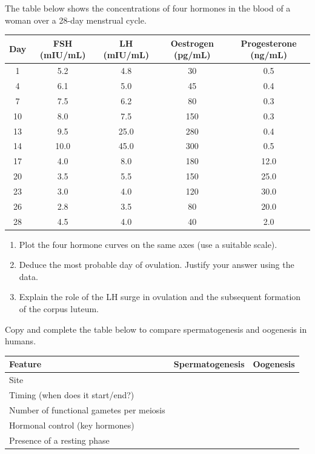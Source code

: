 \documentclass[11pt]{article}
\begin{document}
\begin{exercice}
The table below shows the concentrations of four hormones in the blood of a woman over a 28-day menstrual cycle.

\begin{center}
\begin{tabular}{|c|cccc|}
\hline
Day & FSH (mIU/mL) & LH (mIU/mL) & Oestrogen (pg/mL) & Progesterone (ng/mL) \\
\hline
1 & 5.2 & 4.8 & 30 & 0.5 \\
4 & 6.1 & 5.0 & 45 & 0.4 \\
7 & 7.5 & 6.2 & 80 & 0.3 \\
10 & 8.0 & 7.5 & 150 & 0.3 \\
13 & 9.5 & 25.0 & 280 & 0.4 \\
14 & 10.0 & 45.0 & 300 & 0.5 \\
17 & 4.0 & 8.0 & 180 & 12.0 \\
20 & 3.5 & 5.5 & 150 & 25.0 \\
23 & 3.0 & 4.0 & 120 & 30.0 \\
26 & 2.8 & 3.5 & 80 & 20.0 \\
28 & 4.5 & 4.0 & 40 & 2.0 \\
\hline
\end{tabular}
\end{center}

\begin{enumerate}
\item Plot the four hormone curves on the same axes (use a suitable scale).
\item Deduce the most probable day of ovulation. Justify your answer using the data.
\item Explain the role of the LH surge in ovulation and the subsequent formation of the corpus luteum.
\end{enumerate}
\end{exercice}

\begin{exercice}
Copy and complete the table below to compare spermatogenesis and oogenesis in humans.

\begin{center}
\begin{tabular}{|l|c|c|}
\hline
Feature & Spermatogenesis & Oogenesis \\
\hline
Site & & \\
Timing (when does it start/end?) & & \\
Number of functional gametes per meiosis & & \\
Hormonal control (key hormones) & & \\
Presence of a resting phase & & \\
\hline
\end{tabular}
\end{center}
\end{exercice}
\end{document}
